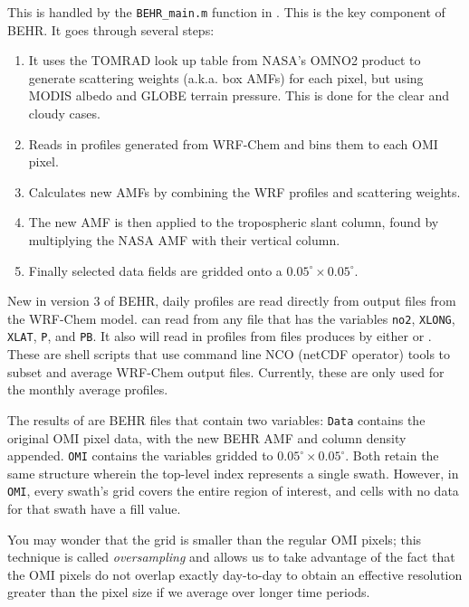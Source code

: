 \documentclass[12pt]{article}
\begin{document}
		This is handled by the \texttt{BEHR\_main.m} function in . This is the key component of BEHR. It goes through several steps:
		\begin{enumerate}
			\item It uses the TOMRAD look up table from NASA's OMNO2 product to generate scattering weights (a.k.a. box AMFs)  for each pixel, but using MODIS albedo and GLOBE terrain pressure.  This is done for the clear and cloudy cases.
			\item Reads in  profiles generated from WRF-Chem and bins them to each OMI pixel.
			\item Calculates new AMFs by combining the WRF profiles and scattering weights.
			\item The new AMF is then applied to the tropospheric slant column, found by multiplying the NASA AMF with their vertical column.
			\item Finally selected data fields are gridded onto a $0.05^\circ \times 0.05^\circ$.  
		\end{enumerate}
		
		New in version 3 of BEHR, daily  profiles are read directly from  output files from the WRF-Chem model.  can read from any  file that has the variables \lstinline$no2$, \lstinline$XLONG$, \lstinline$XLAT$, \lstinline$P$, and \lstinline$PB$. It also will read in profiles from  files produces by either  or . These are shell scripts that use command line NCO (netCDF operator) tools to subset and average WRF-Chem output files. Currently, these are only used for the monthly average profiles.
		
		The results of  are BEHR files that contain two variables: \texttt{Data} contains the original OMI pixel data, with the new BEHR AMF and  column density appended. \texttt{OMI} contains the variables gridded to $0.05^\circ \times 0.05^\circ$. Both retain the same structure wherein the top-level index represents a single swath.  However, in \texttt{OMI}, every swath's grid covers the entire region of interest, and cells with no data for that swath have a fill value.
		
		You may wonder that the grid is smaller than the regular OMI pixels; this technique is called \emph{oversampling} and allows us to take advantage of the fact that the OMI pixels do not overlap exactly day-to-day to obtain an effective resolution greater than the pixel size if we average over longer time periods.
		
\end{document}
